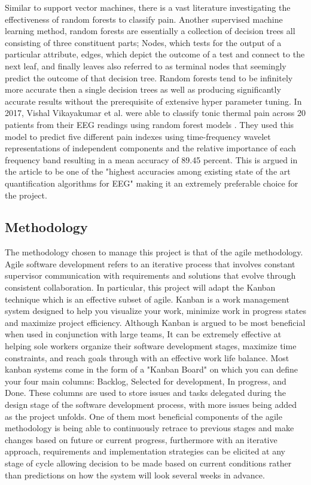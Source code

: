 \documentclass[12pt]{article}
\begin{document}
Similar to support vector machines, there is a vast literature investigating the effectiveness of random forests to classify pain. Another supervised machine learning method, random forests are essentially a collection of decision trees all consisting of three constituent parts; Nodes, which tests for the output of a particular attribute, edges, which depict the outcome of a test and connect to the next leaf, and finally leaves also referred to as terminal nodes that seemingly predict the outcome of that decision tree. Random forests tend to be infinitely more accurate then a single decision trees as well as producing significantly accurate results without the prerequisite of extensive hyper parameter tuning. In 2017, Vishal Vikayakumar et al. were able to classify tonic thermal pain across 20 patients from their EEG readings using random forest models \cite{Lotte2018-ex}. They used this model to predict five different pain indexes using time-frequency wavelet representations of independent components and the relative importance of each frequency band resulting in a mean accuracy of 89.45 percent. This is argued in the article to be one of the "highest accuracies among existing state of the art quantification algorithms for EEG" making it an extremely preferable choice for the project. 

\subsection{Methodology}
The methodology chosen to manage this project is that of the agile methodology. Agile software development refers to an iterative process that involves constant supervisor communication with requirements and solutions that evolve through consistent collaboration. In particular, this project will adapt the Kanban technique which is an effective subset of agile. Kanban is a work management system designed to help you visualize your work, minimize work in progress states and maximize project efficiency. Although Kanban is argued to be most beneficial when used in conjunction with large teams, It can be extremely effective at helping sole workers organize their software development stages, maximize time constraints, and reach goals through with an effective work life balance. Most kanban systems come in the form of a "Kanban Board" on which you can define your four main columns: Backlog, Selected for development, In progress, and Done. These columns are used to store issues and tasks delegated during the design stage of the software development process, with more issues being added as the project unfolds. One of them most beneficial components of the agile methodology is being able to continuously retrace to previous stages and make changes based on future or current progress, furthermore with an iterative approach, requirements and implementation strategies can be elicited at any stage of cycle allowing decision to be made based on current conditions rather than predictions on how the system will look several weeks in advance.
\end{document}
